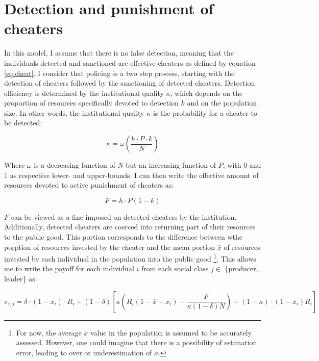 \documentclass[a4paper]{article}
\begin{document}
\section{Detection and punishment of cheaters}
\label{sec:cheat}

In this model, I assume that there is no false detection, meaning that the individuals detected and sanctioned are effective cheaters as defined by equation \ref{eq:cheat}. I consider that policing is a two step process, starting with the detection of cheaters followed by the sanctioning of detected cheaters. Detection efficiency is determined by the institutional quality $\kappa$, which depends on the proportion of resources specifically devoted to detection $k$ and on the population size. In other words, the institutional quality $\kappa$ is the probability for a cheater to be detected:

\begin{equation}
\kappa=\omega\left(\frac{h\cdot P\cdot k}{N}\right)
\end{equation} 

Where $\omega$ is a decreasing function of $N$ but an increasing function of $P$, with $0$ and $1$ as respective lower- and upper-bounds. I can then write the effective amount of resources devoted to active punishment of cheaters as:

\begin{equation}
F=h\cdot P\left(1-k\right)
\end{equation}

$F$ can be viewed as a fine imposed on detected cheaters by the institution. Additionally, detected cheaters are coerced into returning part of their resources to the public good. This portion corresponds to the difference between wthe porption of resources invested by the cheater and the mean portion $\bar{x}$ of resources invested by each individual in the population into the public good \footnote{For now, the average $x$ value in the population is assumed to be accurately assessed. However, one could imagine that there is a possibility of estimation error, leading to over or underestimation of $\bar{x}$.}. This allows me to write the payoff for each individual $i$ from each social class $j\in$ \{producer, leader\} as:

\begin{equation}
\pi_{i,j}=\delta\cdot(1-x_i)\cdot R_i+\left(1-\delta\right)\left[\kappa\left(R_i\left(1-\bar{x}+x_i\right)-\frac{F}{\kappa\left(1-\delta\right)N}\right)+\left(1-\kappa\right)\cdot(1-x_i)R_i\right] 
\end{equation}
\end{document}
